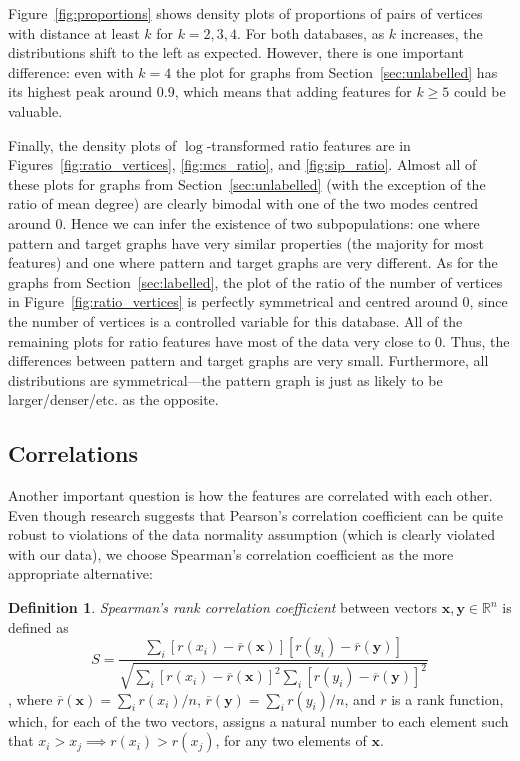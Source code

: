 \documentclass{l4proj}
\theoremstyle{definition}
\newtheorem{definition}{Definition}[chapter]
\theoremstyle{remark}
\begin{document}
Figure~\ref{fig:proportions} shows density plots of proportions of pairs of
vertices with distance at least $k$ for $k = 2, 3, 4$. For both databases, as
$k$ increases, the distributions shift to the left as expected. However, there
is one important difference: even with $k = 4$ the plot for graphs from
Section~\ref{sec:unlabelled} has its highest peak around 0.9, which means that
adding features for $k \ge 5$ could be valuable. 

Finally, the density plots of $\log$-transformed ratio features are in
Figures~\ref{fig:ratio_vertices}, \ref{fig:mcs_ratio}, and \ref{fig:sip_ratio}.
Almost all of these plots for graphs from Section~\ref{sec:unlabelled} (with the
exception of the ratio of mean degree) are clearly bimodal with one of the two
modes centred around 0. Hence we can infer the existence of two subpopulations:
one where pattern and target graphs have very similar properties (the majority
for most features) and one where pattern and target graphs are very different.
As for the graphs from Section~\ref{sec:labelled}, the plot of the ratio of the
number of vertices in Figure~\ref{fig:ratio_vertices} is perfectly symmetrical
and centred around 0, since the number of vertices is a controlled variable for
this database. All of the remaining plots for ratio features have most of the
data very close to 0. Thus, the differences between pattern and target graphs
are very small. Furthermore, all distributions are symmetrical---the pattern
graph is just as likely to be larger/denser/etc. as the opposite.

\subsection{Correlations}

Another important question is how the features are correlated with each other.
Even though research suggests that Pearson's correlation coefficient can be
quite robust to violations of the data normality assumption \cite{article}
(which is clearly violated with our data), we choose Spearman's correlation
coefficient as the more appropriate alternative:

\begin{definition}
  \emph{Spearman's rank correlation coefficient} \cite{mood1974introduction}
  between vectors $\bm{x}, \bm{y} \in \mathbb{R}^n$ is defined as
\[ S = \frac{\sum_i [r(x_i) - \overline{r}(\bm{x})][r(y_i) -
    \overline{r}(\bm{y})]}{\sqrt{\sum_i [r(x_i) -
      \overline{r}(\bm{x})]^2\sum_i [r(y_i) -
      \overline{r}(\bm{y})]^2}} \],
where $\overline{r}(\bm{x}) = \sum_i r(x_i)/n$, $\overline{r}(\bm{y})
= \sum_i r(y_i)/n$, and $r$ is a rank function, which, for each of the two
vectors, assigns a natural number to each element such that $x_i > x_j \implies
r(x_i) > r(x_j)$, for any two elements of $\bm{x}$.
\end{definition}
\end{document}
